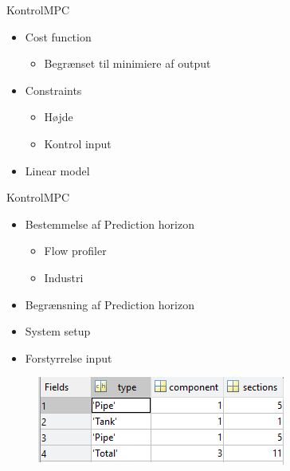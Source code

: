 \begin{frame}{Kontrol}{MPC}
    \vfill\vfill\centering
\begin{itemize}
	\item Cost function
	\begin{itemize}
		\item Begrænset til minimiere af output
	\end{itemize}
	\item Constraints
	\begin{itemize}
		\item Højde
		\item Kontrol input
	\end{itemize}
	\item Linear model
\end{itemize}
\vfill\vfill
\end{frame}





\begin{frame}{Kontrol}{MPC}
  \vfill\vfill\centering



      \begin{minipage}[t]{0.48\linewidth}
    \begin{itemize}
    	\item Bestemmelse af Prediction horizon
    	\begin{itemize}
    		\item Flow profiler
    		\item Industri 
    	\end{itemize}
    	\item Begrænsning af Prediction horizon
    	\item System setup
    	\item Forstyrrelse input
    \end{itemize}   
\end{minipage}\hfill
\begin{minipage}[t]{0.48\linewidth}
\begin{figure}[!h]
\centering
\includegraphics[width=0.97 \textwidth]{figures/mpc_system_setup}
\label{fig:mpc_system_setup}
\end{figure}

\end{minipage}


\vfill\vfill
\end{frame}

